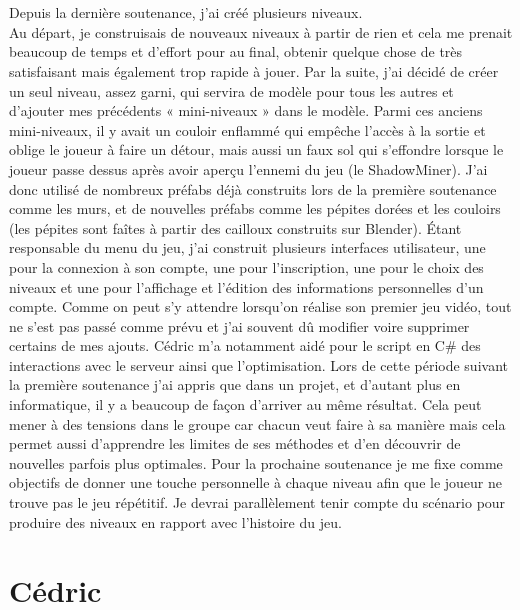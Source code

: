 \documentclass[titlepage, 13px, a4paper]{report}
\begin{document}
\paragraph{} \hspace{0pt} \\
Depuis la dernière soutenance, j'ai créé plusieurs niveaux. \\
Au départ, je construisais de nouveaux niveaux à partir de rien et cela me prenait beaucoup de temps et d'effort pour au final,  
obtenir quelque chose de très satisfaisant mais également trop rapide à jouer. Par la suite, j'ai décidé de créer un seul niveau, 
assez garni, qui servira de modèle pour tous les autres et d'ajouter mes précédents « mini-niveaux » dans le modèle. 
Parmi ces anciens mini-niveaux, il y avait un couloir enflammé qui empêche l'accès à la sortie et oblige le joueur à faire un détour, 
mais aussi un faux sol qui s’effondre lorsque le joueur passe dessus après avoir aperçu l'ennemi du jeu (le ShadowMiner). J'ai donc 
utilisé de nombreux préfabs déjà construits lors de la première soutenance comme les murs, et de nouvelles préfabs 
comme les pépites dorées et les couloirs (les pépites sont faîtes à partir des cailloux construits sur Blender). Étant responsable du 
menu du jeu, j'ai construit plusieurs interfaces utilisateur, une pour la connexion à son compte, une pour l'inscription, une pour le 
choix des niveaux et une pour l'affichage et l’édition des informations personnelles d'un compte. Comme on peut s'y attendre lorsqu'on 
réalise son premier jeu vidéo, tout ne s'est pas passé comme prévu et j'ai souvent dû modifier voire supprimer certains de mes ajouts. 
Cédric m'a notamment aidé pour le script en C\# des interactions avec le serveur ainsi que l'optimisation. 
Lors de cette période suivant la première soutenance j'ai appris que dans un projet, et d'autant plus en informatique, 
il y a beaucoup de façon d'arriver au même résultat. 
Cela peut mener à des tensions dans le groupe car chacun veut faire à sa manière mais cela permet aussi d'apprendre les limites de ses méthodes 
et d’en découvrir de nouvelles parfois plus optimales. 
Pour la prochaine soutenance je me fixe comme objectifs de donner
une touche personnelle à chaque niveau afin que le joueur ne trouve pas le jeu répétitif. Je devrai parallèlement tenir compte 
du scénario pour produire des niveaux en rapport avec l'histoire du jeu.


\newpage



\section{Cédric}
\end{document}
